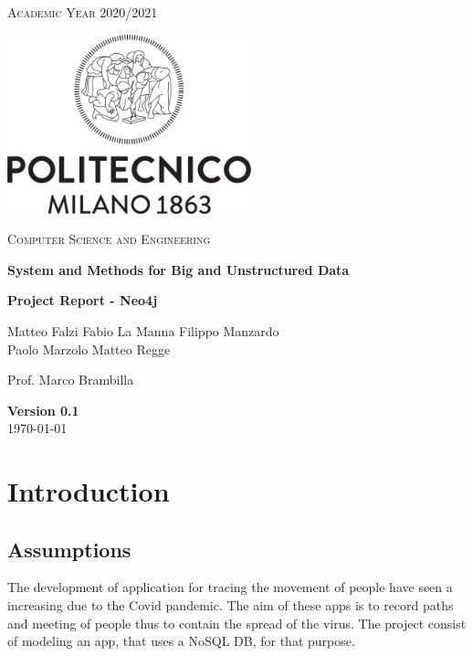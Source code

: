 \documentclass[table, 12pt]{article}
\begin{document}
\begin{titlepage}
    \centering
    \vspace{2cm}
    \scshape\large Academic Year 2020/2021 \par
    \vfill
    \includegraphics[width=200pt]{images/LogoPoliMI}\par\vspace{1cm}
    {\scshape\LARGE Computer Science and Engineering \par}
    \vspace{1.5cm}
    {\Large\bfseries System and Methods for Big and Unstructured Data \par}
    \vspace{0.5cm}
    {\huge\bfseries \textbf{Project Report - Neo4j} \par}
    \vspace{2cm}
    {\large{Matteo Falzi \quad Fabio La Manna \quad Filippo Manzardo \\Paolo Marzolo \quad Matteo Regge}\par}
    \vfill
    {\large Prof. Marco Brambilla }
    \vfill
    {\large \textbf{Version 0.1}\\ \today \par}
\end{titlepage}
\thispagestyle{plain}
\mbox{}


\section{Introduction}

\subsection{Assumptions}
The development of application for tracing the movement of people have seen a increasing due to the Covid pandemic. The aim of these apps is to record  paths and meeting of people thus to contain the spread of the virus. The project consist of modeling an app, that uses a NoSQL DB, for that purpose.
\end{document}
